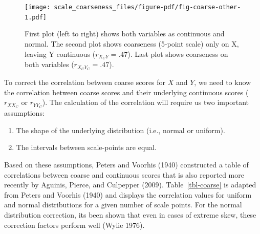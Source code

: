 \documentclass[
  letterpaper,
  DIV=11,
  numbers=noendperiod]{scrreprt}
\providecommand{\tightlist}{%
  \setlength{\itemsep}{0pt}\setlength{\parskip}{0pt}}\usepackage{longtable,booktabs,array}
\begin{document}
\begin{figure}[H]

{\centering \texttt{[image: scale\_coarseness\_files/figure-pdf/fig-coarse-other-1.pdf]}

}

\caption{\label{fig-coarse-other}First plot (left to right) shows both
variables as continuous and normal. The second plot shows coarseness
(5-point scale) only on X, leaving Y continuous (\(r_{X_CY}=.47\)). Last
plot shows coarseness on both variables (\(r_{X_CY_C}=.47\)).}

\end{figure}

To correct the correlation between coarse scores for \(X\) and \(Y\), we
need to know the correlation between coarse scores and their underlying
continuous scores (\(r_{XX_C}\) or \(r_{YY_C}\)). The calculation of the
correlation will require us two important assumptions:

\begin{enumerate}
\def\labelenumi{\arabic{enumi})}
\tightlist
\item
  The shape of the underlying distribution (i.e., normal or uniform).
\item
  The intervals between scale-points are equal.
\end{enumerate}

Based on these assumptions, Peters and Voorhis (1940) constructed a
table of correlations between coarse and continuous scores that is also
reported more recently by Aguinis, Pierce, and Culpepper (2009).
Table~\ref{tbl-coarse} is adapted from Peters and Voorhis (1940) and
displays the correlation values for uniform and normal distributions for
a given number of scale points. For the normal distribution correction,
its been shown that even in cases of extreme skew, these correction
factors perform well (Wylie 1976).
\end{document}

